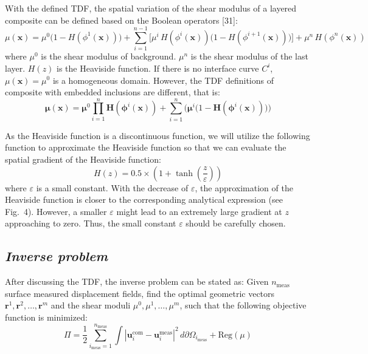 \documentclass[11pt]{article}
\begin{document}
With the defined TDF, the spatial variation of the shear modulus of
a layered composite can be defined based on the Boolean operators
[31]:
\begin{equation}
\mu(\mathbf{x}) = \mu^{0}\bigl(1 - H(\phi^{1}(\mathbf{x}))\bigr)
+ \sum_{i=1}^{n-1}\!\bigl[\mu^{i}\, H(\phi^{i}(\mathbf{x}))
                           \bigl(1 - H(\phi^{i+1}(\mathbf{x}))\bigr)\bigr]
+ \mu^{n}\, H(\phi^{n}(\mathbf{x}))
\end{equation}
where $\mu^{0}$ is the shear modulus of background. $\mu^{n}$ is the
shear modulus of the last layer. $H(z)$ is the Heaviside function.
If there is no interface curve $C^i$, $\mu(\mathbf{x}) = \mu^{0}$ is
a homogeneous domain. However, the TDF definitions of composite with
embedded inclusions are different, that is:
\begin{equation}
\boldsymbol{\mu}\!\left(\boldsymbol{x}\right) =
\boldsymbol{\mu}^{0} \prod_{i=1}^{n}
  \mathbf{H}\!\left(\boldsymbol{\phi}^{i}(\boldsymbol{x})\right)
+ \sum_{i=1}^{n}\!\bigl(\boldsymbol{\mu}^{i}
  \bigl(1 - \mathbf{H}(\boldsymbol{\phi}^{i}(\boldsymbol{x}))\bigr)\bigr)
\end{equation}

As the Heaviside function is a discontinuous function, we will
utilize the following function to approximate the Heaviside function
so that we can evaluate the spatial gradient of the Heaviside
function:
\begin{equation}
H(z) = 0.5 \times \left(1 + \tanh\!\left(\dfrac{z}{\varepsilon}\right)\right)
\end{equation}
where $\varepsilon$ is a small constant. With the decrease of
$\varepsilon$, the approximation of the Heaviside function is closer
to the corresponding analytical expression (see Fig.~4). However, a
smaller $\varepsilon$ might lead to an extremely large gradient at
$z$ approaching to zero. Thus, the small constant $\varepsilon$
should be carefully chosen.

\subsection*{\textit{Inverse problem}}

\noindent
After discussing the TDF, the inverse problem can be stated as:
Given $n_{\text{meas}}$ surface measured displacement fields, find
the optimal geometric vectors $\mathbf{r}^1, \mathbf{r}^2, \ldots,
\mathbf{r}^m$ and the shear moduli $\mu^0, \mu^1, \ldots, \mu^m$,
such that the following objective function is minimized:
\begin{equation}
\Pi = \dfrac{1}{2} \sum_{i_{\text{meas}}=1}^{n_{\text{meas}}}
\int \left|\mathbf{u}_i^{\text{com}} - \mathbf{u}_i^{\text{meas}}\right|^{2}
\, d\partial\Omega_{i_{\text{meas}}} + \text{Reg}(\mu)
\end{equation}
\end{document}
